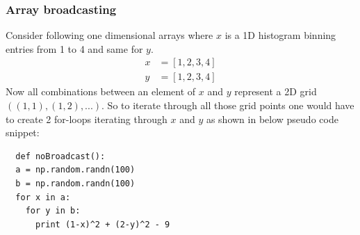 \documentclass[11pt,twoside]{scrreprt}
\begin{document}
\newpage
\subsubsection{Array broadcasting}
Consider following one dimensional arrays where $x$ is a 1D histogram binning entries from 1 to 4 and same for $y$. 
\begin{align*}
  x &= [1, 2, 3, 4]\\
  y &= [1, 2, 3, 4]  
\end{align*}
Now all combinations between an element of $x$ and $y$ represent a 2D grid $\left((1,1), (1,2), ...\right)$. So to iterate through all those grid points one would have to create 2 for-loops iterating through $x$ and $y$ as shown in below pseudo code snippet: %
    \begin{lstlisting}
  def noBroadcast():
  a = np.random.randn(100)
  b = np.random.randn(100) 
  for x in a:
    for y in b:
      print (1-x)^2 + (2-y)^2 - 9
\end{lstlisting} 
\end{document}
